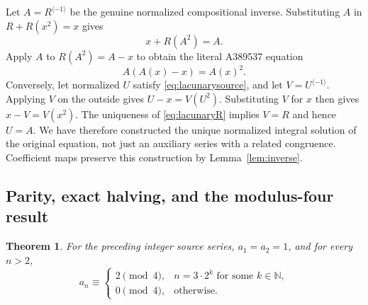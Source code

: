 \documentclass[11pt,a4paper]{article}
\newtheorem{theorem}{Theorem}[section]
\theoremstyle{remark}
\newcommand{\N}{\mathbb N}
\newcommand{\rev}{^{\langle-1\rangle}}
\begin{document}
Let $A=R\rev$ be the genuine normalized compositional inverse.
Substituting $A$ in $R+R(x^2)=x$ gives
\[
 x+R(A^2)=A.
\]
Apply $A$ to $R(A^2)=A-x$ to obtain the literal A389537 equation
\begin{equation}\label{eq:lacunarysource}
 A(A(x)-x)=A(x)^2.
\end{equation}
Conversely, let normalized $U$ satisfy \eqref{eq:lacunarysource},
and let $V=U\rev$. Applying $V$ on the outside gives
$U-x=V(U^2)$. Substituting $V$ for $x$ then gives
$x-V=V(x^2)$. The uniqueness of \eqref{eq:lacunaryR} implies $V=R$
and hence $U=A$. We have therefore constructed the unique normalized
integral solution of the original equation, not just an auxiliary
series with a related congruence. Coefficient maps preserve this
construction by Lemma~\ref{lem:inverse}.

\subsection{Parity, exact halving, and the modulus-four result}

\begin{theorem}\label{thm:lacunary}
For the preceding integer source series, $a_1=a_2=1$, and for every $n>2$,
\[
 a_n\equiv
 \begin{cases}
  2\pmod4,&n=3\cdot2^k\text{ for some }k\in\N,\\
  0\pmod4,&\text{otherwise}.
 \end{cases}
\]
\end{theorem}
\end{document}
